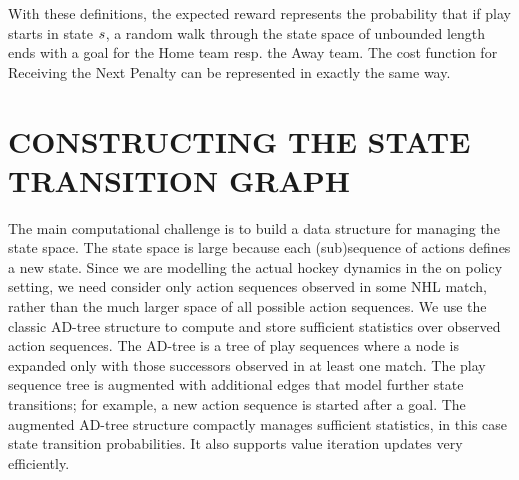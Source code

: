 \documentclass[]{article}
\begin{document}
With these definitions, the expected reward %
%
represents the probability that if play starts in state $s$, a random walk through the state space of unbounded length ends with a goal for the Home team resp. the Away team. The cost function for Receiving the Next Penalty can be represented in exactly the same way.
%


\section{CONSTRUCTING THE STATE TRANSITION GRAPH}
\label{subsec:mdp-construction}

The main computational challenge is to build a data structure for managing the state space. The state space is large because each (sub)sequence of actions defines a new state. Since we are modelling the actual hockey dynamics in the on policy setting, we need consider only action sequences observed in some NHL match, rather than the much larger space of all possible action sequences. We use the classic AD-tree structure \citep{Moore1998} to compute and store sufficient statistics over observed action sequences.
The AD-tree is a tree of play sequences where a node is expanded only with those successors observed in at least one match.
The play sequence tree is augmented with additional edges that model further state transitions; for example, a new action sequence is started after a goal.
The augmented AD-tree structure compactly manages sufficient statistics, in this case state transition probabilities.
It also supports value iteration updates very efficiently.
\end{document}
